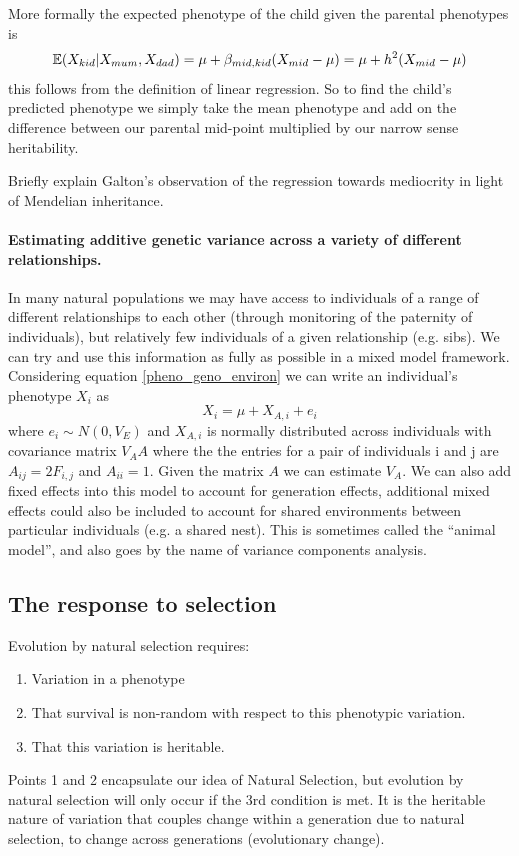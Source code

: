 More formally the expected phenotype of the child given the parental
phenotypes is
\begin{equation}
\mathbb{E}(X_{kid} | X_{mum},X_{dad}) = \mu +
\beta_{mid,kid}(X_{mid} - \mu) =\mu + h^2(X_{mid} - \mu)  \label{predict_kid}
\end{equation}
this follows from the definition of linear regression. So to find the
child's predicted phenotype we simply take the mean phenotype and add
on the difference between our parental mid-point multiplied by our
narrow sense heritability. \\


\begin{question}
Briefly explain Galton’s observation of the regression towards
mediocrity in light of Mendelian inheritance. 
\end{question}

\paragraph{Estimating additive genetic variance across a variety of
  different relationships.}

In many natural populations we may have access to individuals of a
range of different relationships to each other (through monitoring
of the paternity of individuals), but relatively few individuals of a
given relationship (e.g. sibs). We can try and use this information as
fully as possible in a mixed model framework. Considering equation
\ref{pheno_geno_environ} we can write an individual's phenotype $X_i$
 as 
\begin{equation}
X_i =  \mu  + X_{A,i} + e_i 
\end{equation}
where $e_i \sim N(0,V_E)$ and $X_{A,i}$ is normally distributed across
individuals with covariance matrix $V_A A$ where the the entries for
a pair of individuals i and j are 
$A_{ij}= 2 F_{i,j}$ and $A_{ii}= 1$. Given the matrix $A$ we can estimate $V_A$. We can
also add fixed effects into this model to account for generation
effects, additional mixed effects could also be included to account
for shared environments between particular individuals (e.g. a shared nest).
This is sometimes called the ``animal model'', and also goes by the
name of variance components analysis.


\subsection{The response to selection}
Evolution by natural selection requires:
\begin{enumerate}
\item Variation in a phenotype
\item That survival is non-random with respect to this phenotypic
variation.
\item That this variation is heritable.
\end{enumerate}
Points 1 and 2 encapsulate our idea of Natural Selection, but evolution by natural
selection will only occur if the 3rd condition is met. It is the
heritable nature of variation that couples change within a generation
due to natural selection, to change across generations (evolutionary
change). \\

